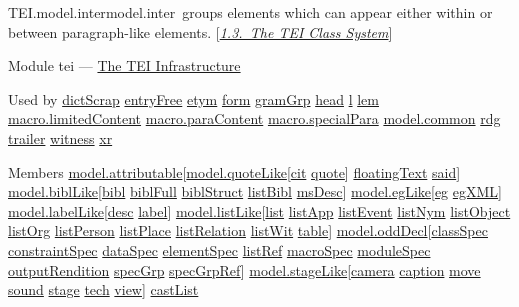 \begin{reflist}
\item[]\begin{specHead}{TEI.model.inter}{model.inter} groups elements which can appear either within or between paragraph-like elements. [\textit{\hyperref[STEC]{1.3.\ The TEI Class System}}]\end{specHead} 
    \item[{Module}]
  tei — \hyperref[ST]{The TEI Infrastructure}
    \item[{Used by}]
  \hyperref[TEI.dictScrap]{dictScrap} \hyperref[TEI.entryFree]{entryFree} \hyperref[TEI.etym]{etym} \hyperref[TEI.form]{form} \hyperref[TEI.gramGrp]{gramGrp} \hyperref[TEI.head]{head} \hyperref[TEI.l]{l} \hyperref[TEI.lem]{lem} \hyperref[TEI.macro.limitedContent]{macro.limitedContent} \hyperref[TEI.macro.paraContent]{macro.paraContent} \hyperref[TEI.macro.specialPara]{macro.specialPara} \hyperref[TEI.model.common]{model.common} \hyperref[TEI.rdg]{rdg} \hyperref[TEI.trailer]{trailer} \hyperref[TEI.witness]{witness} \hyperref[TEI.xr]{xr}
    \item[{Members}]
  \hyperref[TEI.model.attributable]{model.attributable}[\hyperref[TEI.model.quoteLike]{model.quoteLike}[\hyperref[TEI.cit]{cit} \hyperref[TEI.quote]{quote}] \hyperref[TEI.floatingText]{floatingText} \hyperref[TEI.said]{said}] \hyperref[TEI.model.biblLike]{model.biblLike}[\hyperref[TEI.bibl]{bibl} \hyperref[TEI.biblFull]{biblFull} \hyperref[TEI.biblStruct]{biblStruct} \hyperref[TEI.listBibl]{listBibl} \hyperref[TEI.msDesc]{msDesc}] \hyperref[TEI.model.egLike]{model.egLike}[\hyperref[TEI.eg]{eg} \hyperref[TEI.egXML]{egXML}] \hyperref[TEI.model.labelLike]{model.labelLike}[\hyperref[TEI.desc]{desc} \hyperref[TEI.label]{label}] \hyperref[TEI.model.listLike]{model.listLike}[\hyperref[TEI.list]{list} \hyperref[TEI.listApp]{listApp} \hyperref[TEI.listEvent]{listEvent} \hyperref[TEI.listNym]{listNym} \hyperref[TEI.listObject]{listObject} \hyperref[TEI.listOrg]{listOrg} \hyperref[TEI.listPerson]{listPerson} \hyperref[TEI.listPlace]{listPlace} \hyperref[TEI.listRelation]{listRelation} \hyperref[TEI.listWit]{listWit} \hyperref[TEI.table]{table}] \hyperref[TEI.model.oddDecl]{model.oddDecl}[\hyperref[TEI.classSpec]{classSpec} \hyperref[TEI.constraintSpec]{constraintSpec} \hyperref[TEI.dataSpec]{dataSpec} \hyperref[TEI.elementSpec]{elementSpec} \hyperref[TEI.listRef]{listRef} \hyperref[TEI.macroSpec]{macroSpec} \hyperref[TEI.moduleSpec]{moduleSpec} \hyperref[TEI.outputRendition]{outputRendition} \hyperref[TEI.specGrp]{specGrp} \hyperref[TEI.specGrpRef]{specGrpRef}] \hyperref[TEI.model.stageLike]{model.stageLike}[\hyperref[TEI.camera]{camera} \hyperref[TEI.caption]{caption} \hyperref[TEI.move]{move} \hyperref[TEI.sound]{sound} \hyperref[TEI.stage]{stage} \hyperref[TEI.tech]{tech} \hyperref[TEI.view]{view}] \hyperref[TEI.castList]{castList}
\end{reflist}  
